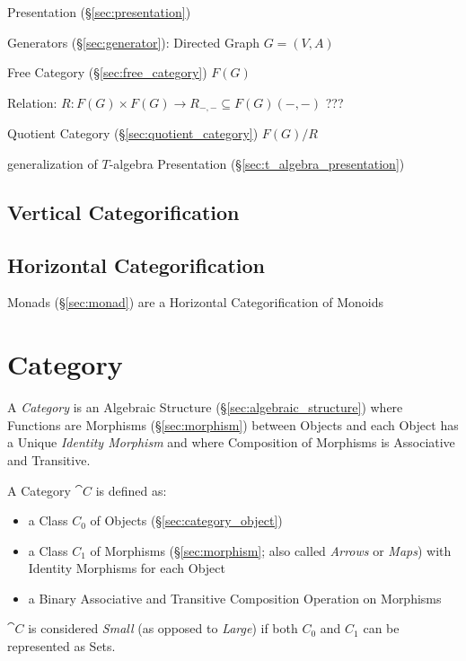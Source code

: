 Presentation (\S\ref{sec:presentation})

Generators (\S\ref{sec:generator}): Directed Graph $G = (V,A)$

Free Category (\S\ref{sec:free_category}) $F(G)$

Relation: $R : F(G) \times F(G) \rightarrow R_{-,-} \subseteq
F(G)(-,-)$ ??? %

Quotient Category (\S\ref{sec:quotient_category}) $F(G) / R$

generalization of $T$-algebra Presentation
(\S\ref{sec:t_algebra_presentation})



\subsection{Vertical Categorification}
\label{sec:vertical_categorification}

\subsection{Horizontal Categorification}
\label{sec:horizontal_categorification}

Monads (\S\ref{sec:monad}) are a Horizontal Categorification of
Monoids



\section{Category}\label{sec:category}

A \emph{Category} is an Algebraic Structure
(\S\ref{sec:algebraic_structure}) where Functions are Morphisms
(\S\ref{sec:morphism}) between Objects and each Object has a Unique
\emph{Identity Morphism} and where Composition of Morphisms is
Associative and Transitive.

A Category $\cat{C}$ is defined as:
\begin{itemize}
\item a Class $C_0$ of Objects (\S\ref{sec:category_object})
\item a Class $C_1$ of Morphisms (\S\ref{sec:morphism}; also called
  \emph{Arrows} or \emph{Maps}) with Identity Morphisms for each
  Object
\item a Binary Associative and Transitive Composition Operation on
  Morphisms
\end{itemize}
$\cat{C}$ is considered \emph{Small} (as opposed to \emph{Large})
if both $C_0$ and $C_1$ can be represented as Sets.

